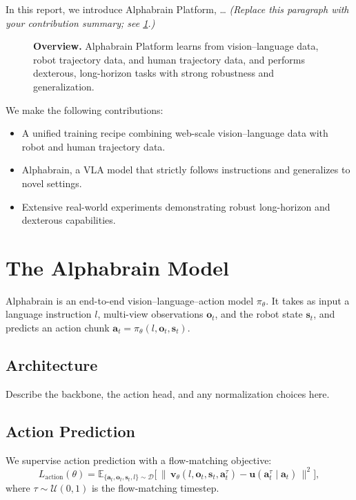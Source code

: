 \documentclass[11pt]{article}
\newcommand{\model}{\mbox{Alphabrain}}
\newcommand{\platform}{Alphabrain Platform}
\begin{document}
In this report, we introduce \platform{}, \ldots
\emph{(Replace this paragraph with your contribution summary; see \cref{fig:overview}.)}

\begin{figure}[t]
  \centering
  \caption{\textbf{Overview.} \platform{} learns from vision–language data,
    robot trajectory data, and human trajectory data, and performs dexterous,
    long-horizon tasks with strong robustness and generalization.}
  \label{fig:overview}
\end{figure}

We make the following contributions:
\begin{itemize}[leftmargin=1.4em,itemsep=2pt,topsep=2pt]
  \item A unified training recipe combining web-scale vision–language data with
        robot and human trajectory data.
  \item \model{}, a VLA model that strictly follows instructions and generalizes
        to novel settings.
  \item Extensive real-world experiments demonstrating robust long-horizon and
        dexterous capabilities.
\end{itemize}

\section{The \texorpdfstring{\model{}}{Alphabrain} Model}\label{sec:model}
\model{} is an end-to-end vision–language–action model $\pi_\theta$. It takes as
input a language instruction $l$, multi-view observations $\mathbf{o}_t$, and the
robot state $\mathbf{s}_t$, and predicts an action chunk
$\mathbf{a}_t = \pi_\theta(l, \mathbf{o}_t, \mathbf{s}_t)$.

\subsection{Architecture}\label{sec:arch}
Describe the backbone, the action head, and any normalization choices here.

\subsection{Action Prediction}\label{sec:action}
We supervise action prediction with a flow-matching objective:
\begin{equation}
  L_{\text{action}}(\theta) =
  \mathbb{E}_{\{\mathbf{a}_t,\mathbf{o}_t,\mathbf{s}_t,l\}\sim\mathcal{D}}
  \Big[\,\big\lVert\, \mathbf{v}_\theta(l,\mathbf{o}_t,\mathbf{s}_t,\mathbf{a}_t^\tau)
  - \mathbf{u}(\mathbf{a}_t^\tau\mid\mathbf{a}_t)\,\big\rVert^2 \Big],
  \label{eq:flow}
\end{equation}
where $\tau\sim\mathcal{U}(0,1)$ is the flow-matching timestep.
\end{document}
